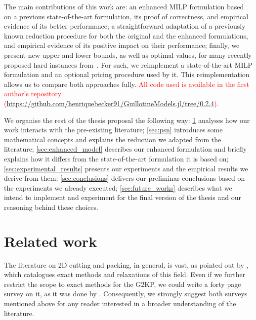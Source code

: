 \documentclass[ppgc,tese,english,formais,babel]{iiufrgs}
\newif\iffinalversion
\newcommand{\newtext}[1]{\iffinalversion%
#1%
\else%
\textcolor{blue}{#1}%
\fi%
}
\newcommand{\oldtext}[1]{\iffinalversion%
\else%
\textcolor{red}{#1}%
\fi%
}
\begin{document}
The main contributions of this work are:
an enhanced MILP formulation based on a previous state-of-the-art formulation, its proof of correctness, and empirical evidence of its better performance;
a straightforward adaptation of a previously known reduction procedure for both the original and the enhanced formulations, and empirical evidence of its positive impact on their performance;
finally, we present new upper and lower bounds, as well as optimal values, for many recently proposed hard instances from~\citet{velasco:2019}.
For such, we reimplement a state-of-the-art MILP formulation and an optional pricing procedure used by it.
This reimplementation allows us to compare both approaches fully.
\oldtext{All code used is available in the first author's repository ({\small\url{https://github.com/henriquebecker91/GuillotineModels.jl/tree/0.2.4}}).}

We organise the rest of the thesis proposal the following way:
\cref{sec:related_work} analyses how our work interacts with the pre-existing literature;
\cref{sec:psn} introduces some mathematical concepts and explains the reduction we adapted from the literature;
\cref{sec:enhanced_model} describes our enhanced formulation and briefly explains how it differs from the state-of-the-art formulation it is based on;
\cref{sec:experimental_results} presents our experiments and the empirical results we derive from them;
\cref{sec:conclusions} delivers our preliminar conclusions based on the experiments we already executed;
\cref{sec:future_works} describes what we intend to implement and experiment for the final version of the thesis and our reasoning behind these choices.

\chapter{Related work}
\label{sec:related_work}

The literature on 2D cutting and packing, in general, is vast, as pointed out by \citet{iori:2020}, which catalogues exact methods and relaxations of this field.
Even if we further restrict the scope to exact methods for the G2KP, we could write a forty page survey on it, as it was done by \citet{russo:2020}.
Consequently, we strongly suggest both surveys mentioned above for any reader interested in a broader understanding of the literature.
\end{document}
